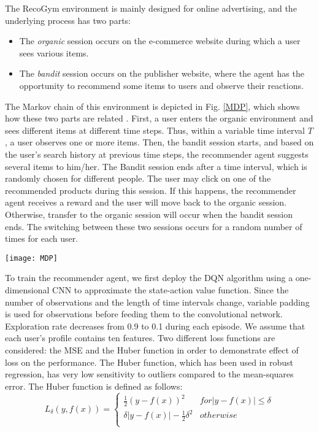 \documentclass[journal]{IEEEtran}
\begin{document}
The RecoGym environment is mainly designed for online advertising, and the underlying process has two parts: 
\begin{itemize}
\item The \textit{organic} session occurs on the e-commerce website during which a user sees various items. 
\item The \textit{bandit} session occurs on the publisher website, where the agent has the opportunity to recommend some items to users and observe their reactions.
\end{itemize}
The Markov chain of this environment is depicted in Fig. \ref{MDP}, which shows how these two parts are related  \cite{rohde2018recogym}. First, a user enters the organic environment and sees different items at different time steps. Thus, within a variable time interval $T$, a user observes one or more items. Then, the bandit session starts, and based on the user's search history at previous time steps, the recommender agent suggests several items to him/her. The Bandit session ends after a time interval, which is randomly chosen for different people. The user may click on one of the recommended products during this session. If this happens, the recommender agent receives a reward and the user will move back to the organic session. Otherwise, transfer to the organic session will occur when the bandit  session ends. The switching between these two sessions occurs for a random number of times for each user.

\begin{figure*}
\begin{center}
\texttt{[image: MDP]}   
\caption{Markov chain of the organic and bandit sessions in the RecoGym environment.} 
\label{MDP}
\end{center}
\end{figure*}

To train the recommender agent, we first deploy the DQN algorithm \cite{mnih2013playing} using a one-dimensional CNN to approximate the state-action value function. Since the number of observations and the length of time intervals change, variable padding is used for observations before feeding them to the convolutional network. Exploration rate decreases from 0.9 to 0.1 during each episode. We assume that each user's profile contains ten features. Two different loss functions are considered: the MSE and the Huber function in order to demonstrate effect of loss on the performance. The Huber function, which has been used in robust regression, has very low sensitivity to outliers compared to  the mean-squares error. The Huber function is defined as follows: 
\begin{equation}
{{L}_{\delta }}\left( y,f(x) \right)=\left\{ \begin{matrix} 
   \frac{1}{2}{{\left( y-f(x) \right)}^{2}} & for\left| y-f(x) \right|\le \delta   \\ 
   \delta \left| y-f(x) \right|-\frac{1}{2}{{\delta }^{2}} & otherwise  \\ 
\end{matrix} \right .
\label{eq3}
\end{equation}
\end{document}
